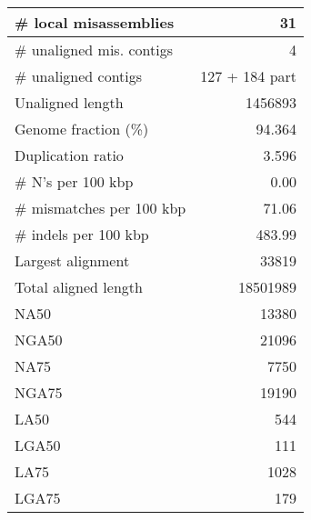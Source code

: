 \documentclass[12pt,a4paper]{article}
\begin{document}
\begin{table}[ht]
\begin{center}
\begin{tabular}{|l*{1}{|r}|}
\# local misassemblies & 31 \\ \hline
\# unaligned mis. contigs & 4 \\ \hline
\# unaligned contigs & 127 + 184 part \\ \hline
Unaligned length & 1456893 \\ \hline
Genome fraction (\%) & 94.364 \\ \hline
Duplication ratio & 3.596 \\ \hline
\# N's per 100 kbp & 0.00 \\ \hline
\# mismatches per 100 kbp & 71.06 \\ \hline
\# indels per 100 kbp & 483.99 \\ \hline
Largest alignment & 33819 \\ \hline
Total aligned length & 18501989 \\ \hline
NA50 & 13380 \\ \hline
NGA50 & 21096 \\ \hline
NA75 & 7750 \\ \hline
NGA75 & 19190 \\ \hline
LA50 & 544 \\ \hline
LGA50 & 111 \\ \hline
LA75 & 1028 \\ \hline
LGA75 & 179 \\ \hline
\end{tabular}
\end{center}
\end{table}
\end{document}
